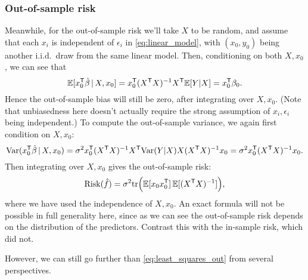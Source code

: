 \documentclass{article}
\begin{document}
\subsubsection{Out-of-sample risk}

Meanwhile, for the out-of-sample risk we'll take $X$ to be random, and assume
that each $x_i$ is independent of $\epsilon_i$ in \eqref{eq:linear_model}, with 
$(x_0,y_0)$ being another i.i.d.\ draw from the same linear model. Then,
conditioning on both $X,x_0$, we can see that
\[
\mathbb{E} [x_0^{\mathsf{T}} \hat{\beta} \,|\, X,x_0] = x_0^{\mathsf{T}} (X^{\mathsf{T}} X)^{-1} X^{\mathsf{T}} \mathbb{E}[Y|X] = x_0^{\mathsf{T}} \beta_0.   
\]
Hence the out-of-sample bias will still be zero, after integrating over
$X,x_0$. (Note that unbiasedness here doesn't actually require the strong
assumption of $x_i,\epsilon_i$ being independent.) To compute the out-of-sample 
variance, we again first condition on $X,x_0$:
\[
\mathrm{Var}(x_0^{\mathsf{T}} \hat{\beta} \,|\, X, x_0) = \sigma^2 x_0^{\mathsf{T}} (X^{\mathsf{T}} X)^{-1} X^{\mathsf{T}} \mathrm{Var}(Y|X)
X (X^{\mathsf{T}} X)^{-1} x_0 = \sigma^2 x_0^{\mathsf{T}} (X^{\mathsf{T}} X)^{-1} x_0.
\]
Then integrating over $X,x_0$ gives the out-of-sample risk:
\begin{equation}
\label{eq:least_squares_out}
\mathrm{Risk}(\hat{f}) = \sigma^2 \mathrm{tr}\Big(\mathbb{E} [x_0 x_0^{\mathsf{T}}] \, \mathbb{E} [(X^{\mathsf{T}} X)^{-1}] \Big), 
\end{equation}
where we have used the independence of $X,x_0$. An exact formula will not be
possible in full generality here, since as we can see the out-of-sample risk
depends on the distribution of the predictors.  Contrast this with the in-sample
risk, which did not.

However, we can still go further than \eqref{eq:least_squares_out} from several
perspectives.   
\end{document}

